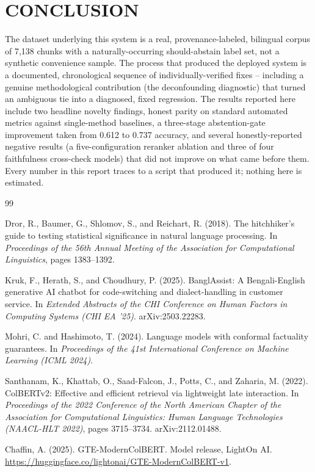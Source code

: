 \documentclass[a4paper,twoside]{article}
\begin{document}
\section{\uppercase{Conclusion}}
\label{sec:conclusion}

The dataset underlying this system is a real, provenance-labeled, bilingual corpus of 7{,}138 chunks with a naturally-occurring should-abstain label set, not a synthetic convenience sample. The process that produced the deployed system is a documented, chronological sequence of individually-verified fixes -- including a genuine methodological contribution (the deconfounding diagnostic) that turned an ambiguous tie into a diagnosed, fixed regression. The results reported here include two headline novelty findings, honest parity on standard automated metrics against single-method baselines, a three-stage abstention-gate improvement taken from 0.612 to 0.737 accuracy, and several honestly-reported negative results (a five-configuration reranker ablation and three of four faithfulness cross-check models) that did not improve on what came before them. Every number in this report traces to a script that produced it; nothing here is estimated.

\begin{thebibliography}{99}
\small

 Dror, R., Baumer, G., Shlomov, S., and Reichart, R. (2018). The hitchhiker's guide to testing statistical significance in natural language processing. In \textit{Proceedings of the 56th Annual Meeting of the Association for Computational Linguistics}, pages 1383--1392.

 Kruk, F., Herath, S., and Choudhury, P. (2025). BanglAssist: A Bengali-English generative AI chatbot for code-switching and dialect-handling in customer service. In \textit{Extended Abstracts of the CHI Conference on Human Factors in Computing Systems (CHI EA '25)}. arXiv:2503.22283.

 Mohri, C. and Hashimoto, T. (2024). Language models with conformal factuality guarantees. In \textit{Proceedings of the 41st International Conference on Machine Learning (ICML 2024)}.

 Santhanam, K., Khattab, O., Saad-Falcon, J., Potts, C., and Zaharia, M. (2022). ColBERTv2: Effective and efficient retrieval via lightweight late interaction. In \textit{Proceedings of the 2022 Conference of the North American Chapter of the Association for Computational Linguistics: Human Language Technologies (NAACL-HLT 2022)}, pages 3715--3734. arXiv:2112.01488.

 Chaffin, A. (2025). GTE-ModernColBERT. Model release, LightOn AI. \url{https://huggingface.co/lightonai/GTE-ModernColBERT-v1}.

\end{thebibliography}
\end{document}
